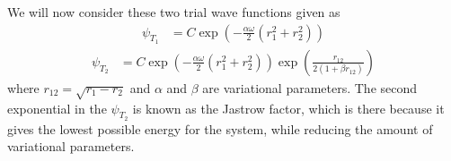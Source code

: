 \documentclass[12pt]{article}
\begin{document}

We will now consider these two trial wave functions given as
\begin{align}
\psi_{T_1} &= C \exp\left(-\frac{\alpha \omega}{2}(r^2_1 + r^2_2)\right)
\label{eq:First_TrialFunc}
\end{align}
\begin{align}
\psi_{T_2} &= C \exp\left(-\frac{\alpha \omega}{2}(r^2_1 + r^2_2)\right)\exp\left(\frac{r_{12}}{2(1+\beta r_{12})}\right)
\label{eq:Second_TrialFunc}
\end{align}
where $r_{12} = \sqrt{r_1 - r_2}$ and $\alpha$ and $\beta$ are variational parameters. The second exponential in the $\psi_{T_2}$ is known as the Jastrow factor, which is there because it gives the lowest possible energy for the system, while reducing the amount of variational parameters.
\end{document}
